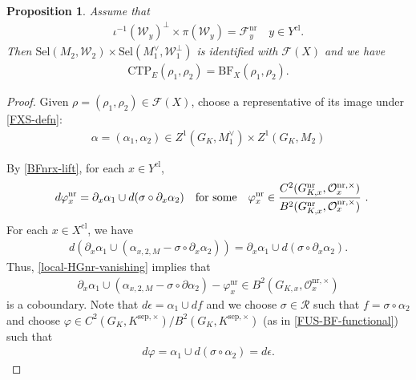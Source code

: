 \documentclass[a4paper]{amsart}
\newtheorem{prop}[thm]{Proposition}
\theoremstyle{definition}
\numberwithin{equation}{section}
\begin{document}
\begin{prop} \label{ctpbf}
Assume that
\begin{eqnarray}
    \iota^{-1}(\mathscr{W}_y)^{\perp}\times \pi(\mathscr{W}_y)= \mathscr{F}_y^\mathrm{nr}
    \quad y \in Y^{\mathrm{cl}}.
\end{eqnarray}
Then $\mathrm{Sel} (M_2,\mathscr{W}_2) \times \mathrm{Sel} (M_1^\vee, \mathscr{W}_1^\perp)$ is identified with $\mathscr{F}(X)$ and we have
    \begin{eqnarray*}
        \mathrm{CTP}_E(\rho_1, \rho_2)= \mathrm{BF}_X(\rho_1, \rho_2).
    \end{eqnarray*}
\end{prop}
\begin{proof}
Given $\rho=(\rho_1,\rho_2)\in\mathscr{F}(X)$, choose a representative of its image under \eqref{FXS-defn}:
\begin{align*}
    \alpha=(\alpha_1,\alpha_2)\in Z^1(G_K,M_1^\vee)\times Z^1(G_K,M_2)
\end{align*}


By \eqref{BFnrx-lift}, for each $x \in Y^{\mathrm{cl}}$,
\begin{align*}
    d\varphi_x^\mathrm{nr}=\partial_x\alpha_{1}\cup d(\sigma\circ\partial_x\alpha_{2})\quad\textrm{for some}\quad\varphi_x^\mathrm{nr}\in\frac{C^2(G_{K,x}^\mathrm{nr},\mathcal{O}_x^{\mathrm{nr},\times})}{B^2(G_{K,x}^\mathrm{nr},\mathcal{O}_x^{\mathrm{nr},\times})}\rlap{\ .}
\end{align*}
For each $x \in X^{\mathrm{cl}}$, we have
\begin{eqnarray*}
    d\left( \partial_x\alpha_{1} \cup( \alpha_{x,2,M}-\sigma \circ \partial_x\alpha_{2} )\right) = \partial_x\alpha_{1}\cup d(\sigma\circ \partial_x\alpha_{2}).
\end{eqnarray*}
Thus, \eqref{local-HGnr-vanishing} implies that
\begin{eqnarray}\label{sectionunr}
    \partial_x\alpha_{1} \cup( \alpha_{x,2,M}-\sigma \circ \partial\alpha_{2}) - \varphi_x^{\mathrm{nr}} \in B^2(G_{K,x}, \mathscr{O}_x^{\mathrm{nr}, \times}) 
\end{eqnarray}
is a coboundary.
Note that $d\epsilon = \alpha_1\cup d f  $ and we choose $\sigma \in \mathscr{R}$ such that $f=\sigma \circ \alpha_2$ and choose $\varphi \in C^2(G_K, K^{\mathrm{sep},\times})/B^2(G_K, K^{\mathrm{sep},\times})$ (as in \eqref{FUS-BF-functional}) such that 
\begin{eqnarray}\label{globalchoice}
   d \varphi = \alpha_1 \cup d(\sigma \circ \alpha_2)=d\epsilon. 
\end{eqnarray}



\end{proof}
\end{document}
